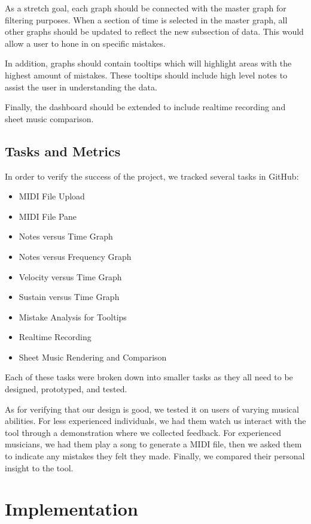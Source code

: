 \documentclass[journal]{vgtc}                %
\begin{document}
As a stretch goal, each graph should be connected with the master graph for
filtering purposes. When a section of time is selected in the master graph,
all other graphs should be updated to reflect the new subsection of data. This
would allow a user to hone in on specific mistakes.

In addition, graphs should contain tooltips which will highlight areas with
the highest amount of mistakes. These tooltips should include high level notes
to assist the user in understanding the data.

Finally, the dashboard should be extended to include realtime recording and sheet
music comparison.

\subsection{Tasks and Metrics}

In order to verify the success of the project, we tracked several tasks in
GitHub:

\begin{itemize}
  \item MIDI File Upload
  \item MIDI File Pane
  \item Notes versus Time Graph
  \item Notes versus Frequency Graph
  \item Velocity versus Time Graph
  \item Sustain versus Time Graph
  \item Mistake Analysis for Tooltips
  \item Realtime Recording
  \item Sheet Music Rendering and Comparison
\end{itemize}

Each of these tasks were broken down into smaller tasks as they all need to be
designed, prototyped, and tested.

As for verifying that our design is good, we tested it on users of varying musical
abilities. For less experienced individuals, we had them watch us interact with
the tool through a demonstration where we collected feedback. For experienced
musicians, we had them play a song to generate a MIDI file, then we asked them
to indicate any mistakes they felt they made. Finally, we compared their
personal insight to the tool.

\section{Implementation}
\end{document}
